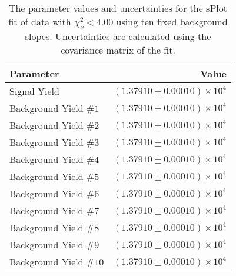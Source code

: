 
\begin{table}[ht]
    \begin{center}
        \begin{tabular}{lr}\toprule
            Parameter & Value \\\midrule
            Signal Yield & $(1.37910 \pm 0.00010) \times 10^{4}$ \\
            Background Yield $\#1$ & $(1.37910 \pm 0.00010) \times 10^{4}$ \\
            Background Yield $\#2$ & $(1.37910 \pm 0.00010) \times 10^{4}$ \\
            Background Yield $\#3$ & $(1.37910 \pm 0.00010) \times 10^{4}$ \\
            Background Yield $\#4$ & $(1.37910 \pm 0.00010) \times 10^{4}$ \\
            Background Yield $\#5$ & $(1.37910 \pm 0.00010) \times 10^{4}$ \\
            Background Yield $\#6$ & $(1.37910 \pm 0.00010) \times 10^{4}$ \\
            Background Yield $\#7$ & $(1.37910 \pm 0.00010) \times 10^{4}$ \\
            Background Yield $\#8$ & $(1.37910 \pm 0.00010) \times 10^{4}$ \\
            Background Yield $\#9$ & $(1.37910 \pm 0.00010) \times 10^{4}$ \\
            Background Yield $\#10$ & $(1.37910 \pm 0.00010) \times 10^{4}$ \\\bottomrule
        \end{tabular}
        \caption{The parameter values and uncertainties for the sPlot fit of data with $\chi^2_\nu < 4.00$ using ten fixed background slopes. Uncertainties are calculated using the covariance matrix of the fit.}\label{tab:splot-fit-results-chisqdof-4.00-fixed-10}
    \end{center}
\end{table}
